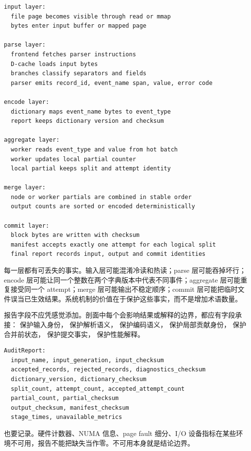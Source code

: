 \begin{lstlisting}[numbers=none,caption={一条记录从输入到提交的剖面}]
input layer:
  file page becomes visible through read or mmap
  bytes enter input buffer or mapped page

parse layer:
  frontend fetches parser instructions
  D-cache loads input bytes
  branches classify separators and fields
  parser emits record_id, event_name span, value, error code

encode layer:
  dictionary maps event_name bytes to event_type
  report keeps dictionary version and checksum

aggregate layer:
  worker reads event_type and value from hot batch
  worker updates local partial counter
  local partial keeps split and attempt identity

merge layer:
  node or worker partials are combined in stable order
  output counts are sorted or encoded deterministically

commit layer:
  block bytes are written with checksum
  manifest accepts exactly one attempt for each logical split
  final report records input, output and commit identities
\end{lstlisting}

每一层都有可丢失的事实。输入层可能混淆冷读和热读；parse 层可能吞掉坏行；encode 层可能让同一个整数在两个字典版本中代表不同事件；aggregate 层可能重复接受同一个 attempt；merge 层可能输出不稳定顺序；commit 层可能把临时文件误当已生效结果。系统机制的价值在于保护这些事实，而不是增加术语数量。

报告字段不应凭感觉添加。剖面中每个会影响结果或解释的边界，都应有字段承接： 保护输入身份， 保护解析语义， 保护编码语义， 保护局部贡献身份， 保护合并前状态， 保护提交事实， 保护性能解释。

\begin{lstlisting}[numbers=none,caption={剖面导出的最小审计字段}]
AuditReport:
  input_name, input_generation, input_checksum
  accepted_records, rejected_records, diagnostics_checksum
  dictionary_version, dictionary_checksum
  split_count, attempt_count, accepted_attempt_count
  partial_count, partial_checksum
  output_checksum, manifest_checksum
  stage_times, unavailable_metrics
\end{lstlisting}

 也要记录。硬件计数器、NUMA 信息、page fault 细分、I/O 设备指标在某些环境不可用，报告不能把缺失当作零。不可用本身就是结论边界。

